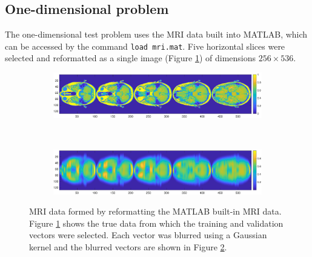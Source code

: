 \documentclass[12pt]{article}
\begin{document}
\subsection{One-dimensional problem} \label{sec:1D}
The one-dimensional test problem uses the MRI data built into MATLAB, which can be accessed by the command \texttt{load mri.mat}. Five horizontal slices were selected and reformatted as a single image (Figure \ref{fig:MRI 1D True}) of dimensions $256 \times 536$. 

\begin{figure}[ht]
\begin{subfigure}{\textwidth}
\includegraphics[scale=0.36]{Figures/Full-MRI}
\subcaption{}
\label{fig:MRI 1D True}
\end{subfigure} \\
\begin{subfigure}{\textwidth}
\includegraphics[scale=0.36]{Figures/Blurred-MRI}
\subcaption{}
\label{fig:MRI 1D Blurred}
\end{subfigure}
\caption{MRI data formed by reformatting the MATLAB built-in MRI data. Figure \ref{fig:MRI 1D True} shows the true data from which the training and validation vectors were selected. Each vector was blurred using a Gaussian kernel and the blurred vectors are shown in Figure \ref{fig:MRI 1D Blurred}.}
\label{fig:MRI 1D}
\end{figure}
\end{document}
